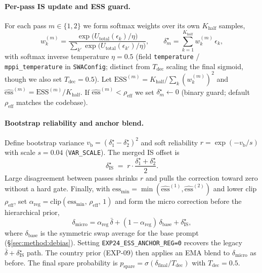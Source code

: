 \documentclass{article}
\begin{document}
\paragraph{Per-pass IS update and ESS guard.}
For each pass $m\in\{1,2\}$ we form softmax weights over its own $K_{\text{half}}$
samples,
\begin{equation}
  w_k^{(m)} = \frac{\exp\!\bigl(U_{\text{total}}(\epsilon_k)/\eta\bigr)}
             {\sum_{k'}\exp\!\bigl(U_{\text{total}}(\epsilon_{k'})/\eta\bigr)},
  \qquad
  \delta^{\star}_m = \sum_{k=1}^{K_{\text{half}}} w_k^{(m)}\,\epsilon_k,
  \label{eq:is_pass}
\end{equation}
with softmax inverse temperature $\eta = 0.5$ (field \texttt{temperature} /
\texttt{mppi\_temperature} in \texttt{SWAConfig}; distinct from
$T_{\text{dec}}$ scaling the final sigmoid, though we also set
$T_{\text{dec}}=0.5$). Let $\mathrm{ESS}^{(m)} = K_{\text{half}} /
\sum_k (w_k^{(m)})^2$ and $\widehat{\mathrm{ess}}^{(m)}=\mathrm{ESS}^{(m)}/K_{\text{half}}$.
If $\widehat{\mathrm{ess}}^{(m)} < \rho_{\mathrm{eff}}$ we set $\delta^{\star}_m \leftarrow 0$
(binary guard; default $\rho_{\mathrm{eff}}$ matches the codebase).

\paragraph{Bootstrap reliability and anchor blend.}
Define bootstrap variance $v_{\mathrm{b}} = (\delta^{\star}_1-\delta^{\star}_2)^2$
and soft reliability $r = \exp(-v_{\mathrm{b}}/s)$ with scale $s{=}0.04$
(\texttt{VAR\_SCALE}). The merged IS offset is
\begin{equation}
  \delta^{\star}_{\mathrm{IS}} \;=\; r \cdot \frac{\delta^{\star}_1 + \delta^{\star}_2}{2}.
  \label{eq:dpbr_rel}
\end{equation}
Large disagreement between passes shrinks $r$ and pulls the correction toward zero
without a hard gate. Finally, with $\mathrm{ess}_{\min}=\min(\widehat{\mathrm{ess}}^{(1)},
\widehat{\mathrm{ess}}^{(2)})$ and lower clip $\rho_{\mathrm{eff}}$, set
$\alpha_{\mathrm{reg}} = \mathrm{clip}(\mathrm{ess}_{\min},\, \rho_{\mathrm{eff}},\, 1)$
and form the micro correction before the hierarchical prior,
\begin{equation}
  \delta_{\mathrm{micro}} = \alpha_{\mathrm{reg}}\,\bar{\delta}
    + (1-\alpha_{\mathrm{reg}})\,\delta_{\text{base}}
    + \delta^{\star}_{\mathrm{IS}},
  \label{eq:ess_anchor}
\end{equation}
where $\delta_{\text{base}}$ is the symmetric swap average for the base prompt
(\S\ref{sec:method:debias}). Setting \texttt{EXP24\_ESS\_ANCHOR\_REG=0} recovers the
legacy $\bar{\delta}+\delta^{\star}_{\mathrm{IS}}$ path. The country prior
(EXP-09) then applies an EMA blend to $\delta_{\mathrm{micro}}$ as before.
The final spare probability is
$p_{\text{spare}} = \sigma(\delta_{\text{final}} / T_{\text{dec}})$ with
$T_{\text{dec}}=0.5$.
\end{document}
